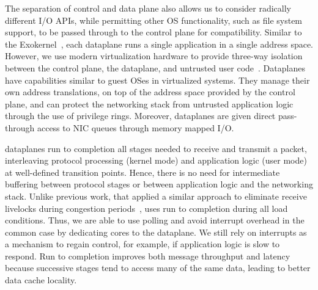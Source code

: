 The separation of control and data plane also allows us to consider
radically different I/O APIs, while permitting other OS functionality,
such as file system support, to be passed through to the control plane
for compatibility.
Similar to the Exokernel~\cite{DBLP:conf/sosp/EnglerKO95}, each
dataplane runs a single application in a single address
space. However, we use modern virtualization hardware to provide
three-way isolation between the control plane, the dataplane, and
untrusted user code~\cite{dune}. Dataplanes have capabilities similar
to guest OSes in virtualized systems. They manage their own address
translations, on top of the address space provided by the control
plane, and can protect the networking stack from untrusted application
logic through the use of privilege rings. Moreover, dataplanes are
given direct pass-through access to NIC queues through memory mapped
I/O.



 \ix dataplanes
run to completion all stages needed to receive and transmit a packet,
interleaving protocol processing (kernel mode) and application logic
(user mode) at well-defined transition points. Hence, there is no need
for intermediate buffering between protocol stages or between
application logic and the networking stack.  Unlike previous work, that
applied a similar approach to eliminate receive livelocks during
congestion periods~\cite{receive-livelock}, \ix uses run to completion
during all load conditions. Thus, we are able to use polling and avoid
interrupt overhead in the common case by dedicating cores to the dataplane. We still rely on interrupts as
a mechanism to regain control, for example, if application logic is slow to
respond.  Run to completion improves both message throughput and
latency because successive stages tend to access many of the same
data, leading to better data cache locality.

